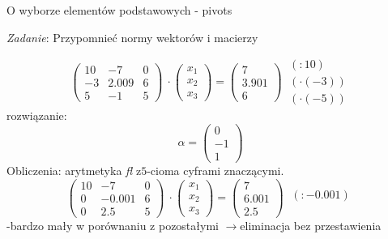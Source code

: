 \begin{frame}{ O wyborze elementów podstawowych - pivots}
\begin{flushright}
{\it Zadanie}: Przypomnieć normy wektorów $\mathrm{i}$ macierzy
\end{flushright}
$$
\left(\begin{array}{lll}
10 & -7 & 0\\
-3 & 2.009 & 6\\
5 & -1 & 5
\end{array}\right)\ \cdot
\left(\begin{array}{l}
x_{1}\\
x_{2}\\
x_{3}
\end{array}\right)=\left(\begin{array}{l}
7\\
3.901\\
6
\end{array}\right)\ 
\begin{array}{l}
(:10)\\
(\cdot(-3))\\
(\cdot(-5))
\end{array}
$$
rozwiązanie:
$$
\alpha=\left(\begin{array}{l}
0\\
-1\\
1
\end{array}\right)
$$
Obliczenia: arytmetyka {\it fl} $\mathrm{z} 5$-cioma cyframi znaczącymi.
$$
\left(\begin{array}{lll}
10 & -7 & 0\\
0 & -0.001 & 6\\
0 & 2.5 & 5
\end{array}\right)\ \cdot
\left(\begin{array}{l}
x_{1}\\
x_{2}\\
x_{3}
\end{array}\right)=\left(\begin{array}{l}
7\\
6.001\\
2.5
\end{array}\right)\ 
\begin{array}{l}
\\
(:-0.001)
\\
\\
\end{array}
$$
 -bardzo mały w porównaniu z pozostałymi $\rightarrow$eliminacja bez przestawienia

\end{frame}
